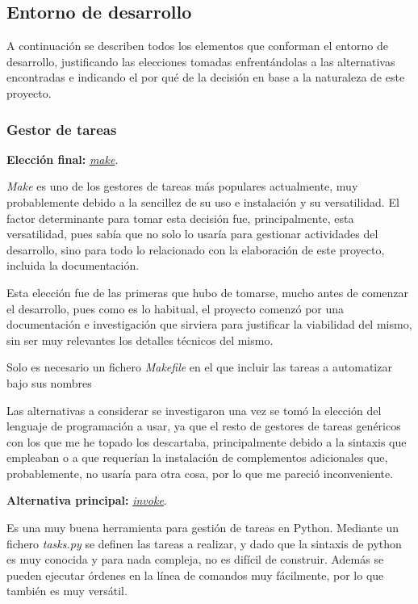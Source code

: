 \subsection{Entorno de desarrollo}

A continuación se describen todos los elementos que conforman el entorno de desarrollo, justificando las elecciones tomadas enfrentándolas a las alternativas encontradas e indicando el por qué de la decisión en base a la naturaleza de este proyecto.

\subsubsection{Gestor de tareas}

\textbf{Elección final:} \href{https://www.gnu.org/software/make/}{\textit{make}}.

\textit{Make} es uno de los gestores de tareas más populares actualmente, muy probablemente debido a la sencillez de su uso e instalación y su versatilidad. El factor determinante para tomar esta decisión fue, principalmente, esta versatilidad, pues sabía que no solo lo usaría para gestionar actividades del desarrollo, sino para todo lo relacionado con la elaboración de este proyecto, incluida la documentación.

Esta elección fue de las primeras que hubo de tomarse, mucho antes de comenzar el desarrollo, pues como es lo habitual, el proyecto comenzó por una documentación e investigación que sirviera para justificar la viabilidad del mismo, sin ser muy relevantes los detalles técnicos del mismo.

Solo es necesario un fichero \textit{Makefile} en el que incluir las tareas a automatizar bajo sus nombres

Las alternativas a considerar se investigaron una vez se tomó la elección del lenguaje de programación a usar, ya que el resto de gestores de tareas genéricos con los que me he topado los descartaba, principalmente debido a la sintaxis que empleaban o a que requerían la instalación de complementos adicionales que, probablemente, no usaría para otra cosa, por lo que me pareció inconveniente.

\textbf{Alternativa principal:} \href{https://www.pyinvoke.org/}{\textit{invoke}}.

Es una muy buena herramienta para gestión de tareas en Python. Mediante un fichero \textit{tasks.py} se definen las tareas a realizar, y dado que la sintaxis de python es muy conocida y para nada compleja, no es difícil de construir. Además se pueden ejecutar órdenes en la línea de comandos muy fácilmente, por lo que también es muy versátil.

